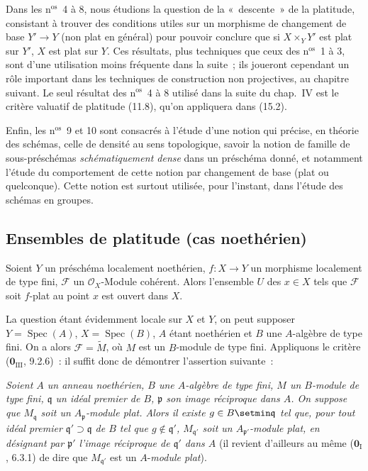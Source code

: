 Dans les n$^\mathrm{os}$~4 à 8, nous étudions la question de la «~descente~» de
la platitude, consistant à trouver des conditions utiles sur un morphisme de
changement de base $Y'\to Y$ (non plat en général) pour pouvoir conclure que si
$X\times_YY'$ est plat sur $Y'$, $X$ est plat sur $Y$. Ces résultats, plus
techniques que ceux des n$^\mathrm{os}$~1 à 3, sont d'une utilisation moins
fréquente dans la suite~; ils joueront cependant un rôle important dans les
techniques de construction non projectives, au chapitre suivant. Le seul
résultat des n$^\mathrm{os}$~4 à 8 utilisé dans la suite du chap.~IV est le
critère valuatif de platitude (11.8), qu'on appliquera dans (15.2).

Enfin, les n$^\mathrm{os}$~9 et 10 sont consacrés à l'étude d'une notion qui
précise, en théorie des schémas, celle de densité au sens topologique, savoir la
notion de famille de sous-préschémas \emph{schématiquement dense} dans un
préschéma donné, et notamment l'étude du comportement de cette notion par
changement de base (plat ou quelconque). Cette notion est surtout utilisée,
pour l'instant, dans l'étude des schémas en groupes.

\subsection{Ensembles de platitude (cas noethérien)}
\label{subsection:IV.11.1-fr}

\begin{theorem}[11.1.1]
\label{IV.11.1.1-fr}
Soient $Y$ un préschéma localement noethérien, $f:X\to Y$ un morphisme
localement de type fini, $\mathcal F$ un $\mathcal O_X$-Module cohérent. Alors
l'ensemble $U$ des $x\in X$ tels que $\mathcal F$ soit $f$-plat au point $x$
est ouvert dans $X$.
\end{theorem}

La question étant évidemment locale sur $X$ et $Y$, on peut supposer
$Y=\operatorname{Spec}(A)$, $X=\operatorname{Spec}(B)$, $A$ étant noethérien et
$B$ une $A$-algèbre de type fini. On a alors $\mathcal F=\widetilde M$, où $M$
est un $B$-module de type fini. Appliquons le critère
($\mathbf 0_{\mathrm{III}}$, 9.2.6)~: il suffit donc de démontrer l'assertion
suivante~:

\begin{env}[11.1.1.1]
\label{IV.11.1.1.1-fr}
\emph{Soient $A$ un anneau noethérien, $B$ une $A$-algèbre de type fini, $M$ un
$B$-module de type fini, $\mathfrak q$ un idéal premier de $B$, $\mathfrak p$
son image réciproque dans $A$. On suppose que $M_{\mathfrak q}$ soit un
$A_{\mathfrak p}$-module plat. Alors il existe $g\in B\setmin\mathfrak q$ tel que,
pour tout idéal premier $\mathfrak q'\supset\mathfrak q$ de $B$ tel que
$g\notin\mathfrak q'$, $M_{\mathfrak q'}$ soit un
$A_{\mathfrak p'}$-module plat, en désignant par $\mathfrak p'$ l'image
réciproque de $\mathfrak q'$ dans $A$} (il revient d'ailleurs au même
($\mathbf 0_{\mathrm I}$, 6.3.1) de dire que $M_{\mathfrak q'}$ est un
$A$-\emph{module plat}).
\end{env}

